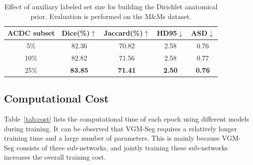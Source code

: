 \documentclass[preprint,12pt]{elsarticle}
\begin{document}
\begin{table}[htbp]
  \centering
  \caption{Effect of auxiliary labeled set size for building the Dirichlet anatomical prior. Evaluation is performed on the M\&Ms dataset. }
  \begin{tabular}{c c c c c}
    \toprule
    ACDC subset & Dice(\%)$\uparrow$ & Jaccard(\%)$\uparrow$ & HD95$\downarrow$ & ASD$\downarrow$ \\
    \midrule
    5\%  & 82.36 & 70.82 & 2.58 & 0.76 \\
    10\% & 82.82 & 71.56 & 2.58 & 0.77 \\
    25\% & \textbf{83.85} & \textbf{71.41} & \textbf{2.50} & \textbf{0.76} \\
    \bottomrule
  \end{tabular}
  \label{tab:ablation_prior_size}
\end{table}



\subsection{Computational Cost}

Table~\ref{tab:cost} lists the computational time of each epoch using different models during training. It can be observed that VGM-Seg requires a relatively longer training time and a large number of parameters. This is mainly because VGM-Seg consists of three sub-networks, and jointly training these sub-networks increases the overall training cost. 
\end{document}
